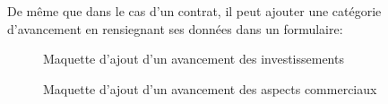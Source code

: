 \documentclass[a4paper]{report}
\begin{document}
\begin{doublespace}
	De même que dans le cas d'un contrat, il peut ajouter une catégorie d'avancement en rensiegnant ses données dans un formulaire:
	\begin{figure}[H]
		\begin{center}
			\caption{Maquette d'ajout d'un avancement des investissements}
		\end{center}
	\end{figure}

	\begin{figure}[H]
		\begin{center}
			\caption{Maquette d'ajout d'un avancement des aspects commerciaux}
		\end{center}
	\end{figure}


\end{doublespace}
\end{document}
